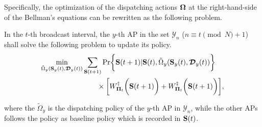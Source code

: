 Specifically, the optimization of the dispatching actions $\boldsymbol{\Omega}$ at the right-hand-side of the Bellman's equations can be rewritten as the following problem.
\begin{problem}[]
    In the $t$-th broadcast interval, the $y$-th AP in the set $\mathcal{Y}_{n}$ ($n \equiv t \pmod{N} + 1$) shall solve the following problem to update its policy.
    {\small
    \begin{align}
        \min_{ \tilde{\Omega}_{y}(\Stat_{y}(t),\Delay_{y}(t)) }
        &\sum_{\Stat(t+1)} \Pr\Brace{
            \Stat(t+1) | \Stat(t), \tilde{\Omega}_{y}(\Stat_{y}(t),\Delay_{y}(t))
        }
        \nonumber\\
        &~~~~~~
        \times \Bracket{
            W^{\AP}_{\Baseline_{t}} \Paren{\Stat(t+1)} +
            W^{\ES}_{\Baseline_{t}} \Paren{\Stat(t+1)}
        },
    \end{align}
    }
    \label{problem_2}
\end{problem}
where the $\tilde{\Omega}_{y}$ is the dispatching policy of the $y$-th AP in $\mathcal{Y}_{n}$, while the other APs follows the policy as baseline policy which is recorded in $\mathbf{S}(t)$.

